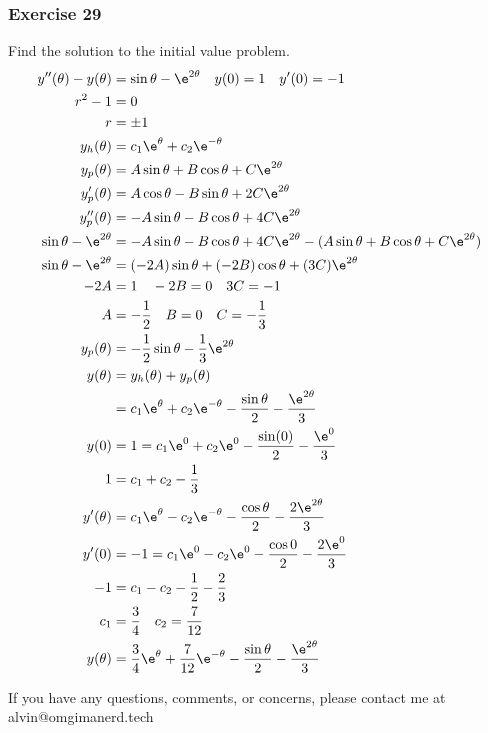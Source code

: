 \documentclass{math}
\begin{document}
\subsubsection*{Exercise 29}
Find the solution to the initial value problem.
\begin{align*}
  y''(\theta)-y(\theta) &= \sin\theta-\e^{2\theta} \quad y(0) = 1 \quad
    y'(0) = -1 \\
  r^2-1 &= 0 \\
  r &= \pm1 \\
  y_h(\theta) &= c_1\e^{\theta}+c_2\e^{-\theta} \\
  y_p(\theta) &= A\sin\theta+B\cos\theta+C\e^{2\theta} \\
  y_p'(\theta) &= A\cos\theta-B\sin\theta+2C\e^{2\theta} \\
  y_p''(\theta) &= -A\sin\theta-B\cos\theta+4C\e^{2\theta} \\
  \sin\theta-\e^{2\theta} &= -A\sin\theta-B\cos\theta+4C\e^{2\theta}-
    (A\sin\theta+B\cos\theta+C\e^{2\theta}) \\
  \sin\theta-\e^{2\theta} &= (-2A)\sin\theta+(-2B)\cos\theta+(3C)\e^{2\theta} \\
  -2A &= 1 \quad -2B = 0 \quad 3C = -1 \\
  A &= -\frac{1}{2} \quad B = 0 \quad C = -\frac{1}{3} \\
  y_p(\theta) &= -\frac{1}{2}\sin\theta-\frac{1}{3}\e^{2\theta} \\
  y(\theta) &= y_h(\theta)+y_p(\theta) \\
  &= c_1\e^{\theta}+c_2\e^{-\theta}-\frac{\sin\theta}{2}-
    \frac{\e^{2\theta}}{3} \\
  y(0) &= 1 = c_1\e^0+c_2\e^0-\frac{\sin(0)}{2}-\frac{\e^0}{3} \\
  1 &= c_1+c_2-\frac{1}{3} \\
  y'(\theta) &=
    c_1\e^\theta-c_2\e^{-\theta}-\frac{\cos\theta}{2}-\frac{2\e^{2\theta}}{3} \\
  y'(0) &= -1 = c_1\e^0-c_2\e^0-\frac{\cos0}{2}-\frac{2\e^0}{3} \\
  -1 &= c_1-c_2-\frac{1}{2}-\frac{2}{3} \\
  c_1 &= \frac{3}{4} \quad c_2 = \frac{7}{12} \\
  y(\theta) &= \frac{3}{4}\e^\theta+\frac{7}{12}\e^{-\theta}-
    \frac{\sin\theta}{2}-\frac{\e^{2\theta}}{3}
\end{align*}

\begin{center}
  If you have any questions, comments, or concerns, please contact me at
  alvin@omgimanerd.tech
\end{center}
\end{document}
